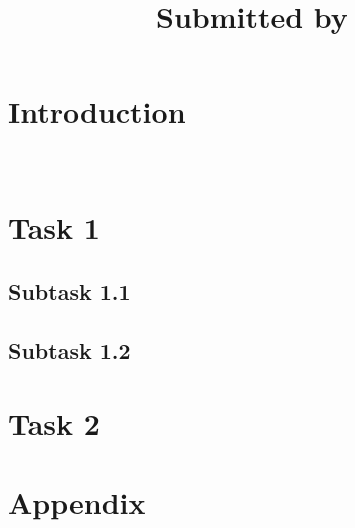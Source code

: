 \documentclass[11pt]{article}
\title{{\huge\sffamily\bfseries \ProjectName} \\ \vspace{10pt} {\Large\it \ReportName} \\ \vspace{20pt} {\normalsize Submitted by~\Author}}
\date{}
\newif\ifshowcomments
\theoremstyle{definition}
\theoremstyle{remark}
\newcommand{\task}[1]{%
    \ifshowcomments
        ~\todo[inline, color=buzzgold!60, textcolor=black,caption={Task}]{{\bf Task:} #1}%
    \fi
}
\newcommand{\prompt}[1]{%
    \ifshowcomments
        ~\todo[inline, color=techgold!80, textcolor=black,caption={Task}]{{\bf Prompt:} #1}%
    \fi
}
\newcommand{\hans}[1]{%
    \ifshowcomments
        \noindent\textcolor{buzzgold}{[Hans]: #1}%
    \fi
}
\newcommand{\ai}[1]{%
    \ifshowcomments
        \noindent\textcolor{techred}{[AI Agent]: #1}%
    \fi
}
\begin{document}
\maketitle
\vspace{1cm}
\tableofcontents
\vspace{1cm}
\thispagestyle{fancy}

\section{Introduction}

\hans{My comments look like this!}~\ai{AI agents can make comments that look like this!}

\prompt{Official language or prompts look like this!}

\task{To-do's and other tasks look like this!}

\section{Task 1}

\lipsum[1]

\subsection{Subtask 1.1}
\label{sec:convergence}

\lipsum[3]

\subsection{Subtask 1.2}
\label{sec:convergence}

\lipsum[4]

\section{Task 2}

\lipsum[5]

\nocite{*}



\appendix
\section{Appendix}

\end{document}
